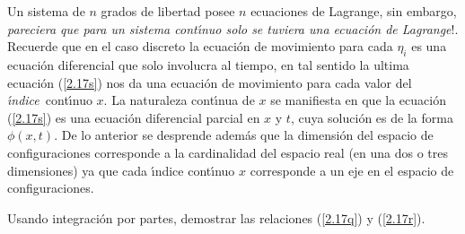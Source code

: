 Un sistema de $n$ grados de libertad posee $n$ ecuaciones de Lagrange, sin embargo, \textexclamdown \emph{pareciera que para un sistema cont\'{\i}nuo solo se tuviera una ecuaci\'{o}n de Lagrange}!. Recuerde que en el caso discreto la ecuaci\'{o}n de movimiento para cada $\eta _{i}$ es una ecuaci\'{o}n diferencial que solo involucra al tiempo, en tal sentido la ultima ecuaci\'{o}n (\ref{2.17s}) nos da una ecuaci\'{o}n de movimiento para cada valor del \emph{\'{\i}ndice}\ cont\'{\i}nuo $x$. La naturaleza cont\'{\i}nua de $x$ se manifiesta en que la ecuaci\'{o}n (\ref{2.17s}) es una ecuaci\'{o}n diferencial parcial en $x$ y $t$, cuya soluci\'{o}n es de la forma $\phi \left( x,t\right) $. De lo anterior se desprende adem\'{a}s que la dimensi\'{o}n del espacio de configuraciones corresponde a la cardinalidad del espacio real (en una dos o tres dimensiones) ya que cada \'{\i}ndice cont\'{\i}nuo $x$ corresponde a un eje en el espacio de configuraciones.

\vspace{0.2cm}
\begin{exercise}
Usando integraci\'{o}n por partes, demostrar las relaciones (\ref{2.17q}) y (\ref{2.17r}).
\end{exercise}

